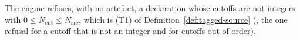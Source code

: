 
\begin{requirement}\label{req:cutoff-order}
The engine refuses, with no artefact, a declaration whose cutoffs are not
integers with $0\le N_{\mathrm{ent}}\le N_{\mathrm{src}}$, which is (T1) of
Definition~\ref{def:tagged-source} (, the one
refusal for a cutoff that is not an integer and for cutoffs out of order).
\end{requirement}
